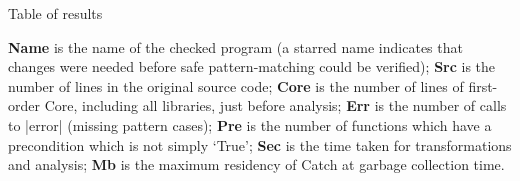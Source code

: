 \documentclass[preprint]{sigplanconf}
\begin{document}
\begin{table}
\caption{Table of results}
\label{tab:results}

\smallskip

\textbf{Name} is the name of the checked program (a starred name indicates that changes were needed before safe pattern-matching could be verified);
\textbf{Src} is the number of lines in the original source code;
\textbf{Core} is the number of lines of first-order Core, including all libraries, just before analysis;
\textbf{Err} is the number of calls to |error| (missing pattern cases);
\textbf{Pre} is the number of functions which have a precondition which is not simply `True';
\textbf{Sec} is the time taken for transformations and analysis;
\textbf{Mb} is the maximum residency of Catch at garbage collection time.

\smallskip\smallskip


\end{table}
\end{document}
